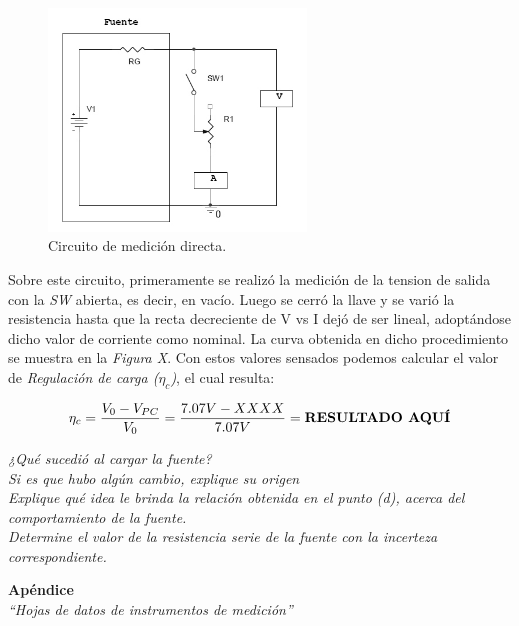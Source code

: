 \documentclass{article}
\begin{document}
\begin{figure}[h]
	\centering
	\includegraphics[width=0.61\textwidth]{images/p3-item-a.jpg}
	\caption{Circuito de medición directa.}
\end{figure}
\bigskip\bigskip


\noindent Sobre este circuito, primeramente se realizó la medición de la tension de salida con la \textit{SW} abierta, es decir, en vacío. Luego se cerró la llave y se varió la resistencia hasta que la recta decreciente de V vs I dejó de ser lineal, adoptándose dicho valor de corriente como nominal. La curva obtenida en dicho procedimiento se muestra en la \textit{Figura X}. Con estos valores sensados podemos calcular el valor de \textit{Regulación de carga ($\eta_c$)}, el cual resulta:
\bigskip


\begin{equation}
 	\eta_c = {V_0 - V_{PC} \over V_0} = {7.07V - XXXX \over 7.07V} = \textbf{RESULTADO AQUÍ}
\end{equation}
\bigskip



\textit{¿Qué sucedió al cargar la fuente?} \\

\textit{Si es que hubo algún cambio, explique su origen} \\

\textit{Explique qué idea le brinda la relación obtenida en el punto (d), acerca del comportamiento de la fuente.} \\

\textit{Determine el valor de la resistencia serie de la fuente con la incerteza correspondiente.} \\


\newpage
\vspace*{4cm}
\begin{center}
	\textbf{\Huge{Apéndice}} \\
	\bigskip\bigskip
	\Large{\textit{``Hojas de datos de instrumentos de medición''}}
\end{center}
\end{document}
